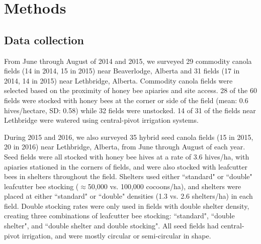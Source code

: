 \documentclass[12pt]{article} %
\begin{document}
\section{Methods}

\subsection{Data collection}
From June through August of 2014 and 2015, we surveyed 29 commodity canola fields (14 in 2014, 15 in 2015) near Beaverlodge, Alberta and 31 fields (17 in 2014, 14 in 2015) near Lethbridge, Alberta.
Commodity canola fields were selected based on the proximity of honey bee apiaries and site access. 
28 of the 60 fields were stocked with honey bees at the corner or side of the field (mean: 0.6 hives/hectare, SD: 0.58) while 32 fields were unstocked. %
14 of 31 of the fields near Lethbridge were watered using central-pivot irrigation systems.

During 2015 and 2016, we also surveyed 35 hybrid seed canola fields (15 in 2015, 20 in 2016) near Lethbridge, Alberta, from June through August of each year.
Seed fields were all stocked with honey bee hives at a rate of 3.6 hives/ha, with apiaries stationed in the corners of fields, and were also stocked with leafcutter bees in shelters throughout the field.
Shelters used either ``standard" or ``double"  leafcutter bee stocking ($\approx$50,000 vs. 100,000 cocoons/ha), and shelters were placed at either ``standard" or ``double" densities (1.3 vs. 2.6 shelters/ha) in each field.
Double stocking rates were only used in fields with double shelter density, creating three combinations of leafcutter bee stocking: ``standard", ``double shelter", and ``double shelter and double stocking".
All seed fields had central-pivot irrigation, and were mostly circular or semi-circular in shape.
\end{document}
